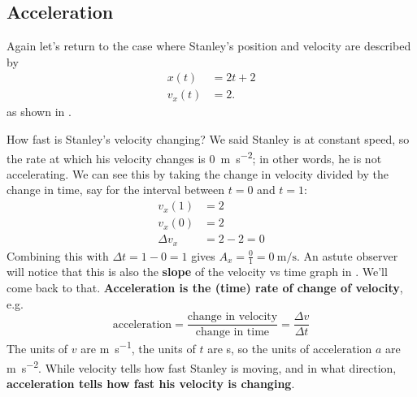 \documentclass{tufte-handout}
\begin{document}
\subsection{Acceleration}
Again let's return to the case where Stanley's position and velocity are described by
\begin{align}
x(t) &= 2 t + 2 \\
v_x(t) &= 2. 
\end{align}
as shown in .
\begin{marginfigure}
\caption{Stanley's position, velocity, and acceleration}
\label{fig:acceleration1}
\end{marginfigure}
How fast is Stanley's velocity changing? We said Stanley is at constant speed, so the rate at which his velocity changes is \SI{0}{\meter\per\second\squared}; in other words, he is not accelerating. We can see this by taking the change in velocity divided by the change in time, say for the interval between $t=0$ and $t=1$:
\begin{align}
v_x(1) &= 2 \\
v_x(0) &= 2 \\
\Delta v_x &= 2 - 2 = 0
\end{align}
Combining this with $\Delta t = 1-0 = 1$ gives $A_x=\frac{0}{1}=\SI{0}{\meter\per\second}$. An astute observer will notice that this is also the \textbf{slope} of the velocity vs time graph in . We'll come back to that.  \textbf{Acceleration is the (time) rate of change of velocity}, e.g.
\begin{equation}
\text{acceleration} = \dfrac{\text{change in velocity}}{\text{change in time}} = \dfrac{\Delta v}{\Delta t}
\end{equation}
The units of $v$ are \si{\meter\per\second}, the units of $t$ are \si{\second}, so the units of acceleration $a$ are \si{\meter\per\second\squared}. While velocity tells how fast Stanley is moving, and in what direction, \textbf{acceleration tells how fast his velocity is changing}. 
\end{document}
